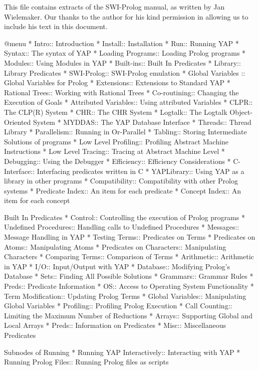 This file contains extracts of the SWI-Prolog manual, as written by Jan
Wielemaker. Our thanks to the author for his kind permission in allowing
us to include his text in this document.

@menu
* Intro:: Introduction
* Install:: Installation
* Run:: Running YAP
* Syntax:: The syntax of YAP
* Loading Programs:: Loading Prolog programs
* Modules:: Using Modules in YAP
* Built-ins:: Built In Predicates
* Library:: Library Predicates
* SWI-Prolog:: SWI-Prolog emulation
* Global Variables ::  Global Variables for Prolog
* Extensions:: Extensions to Standard YAP
* Rational Trees:: Working with Rational Trees
* Co-routining:: Changing the Execution of Goals
* Attributed Variables:: Using attributed Variables
* CLPR:: The CLP(R) System
* CHR:: The CHR System
* Logtalk:: The Logtalk Object-Oriented System
* MYDDAS:: The YAP Database Interface
* Threads:: Thread Library
* Parallelism:: Running in Or-Parallel
* Tabling:: Storing Intermediate Solutions of programs 
* Low Level Profiling:: Profiling Abstract Machine Instructions
* Low Level Tracing:: Tracing at Abstract Machine Level
* Debugging:: Using the Debugger
* Efficiency:: Efficiency Considerations
* C-Interface:: Interfacing predicates written in C
* YAPLibrary:: Using YAP as a library in other programs
* Compatibility:: Compatibility with other Prolog systems
* Predicate Index:: An item for each predicate
* Concept Index:: An item for each concept

Built In Predicates
* Control:: Controlling the execution of Prolog programs
* Undefined Procedures:: Handling calls to Undefined Procedures
* Messages:: Message Handling in YAP
* Testing Terms:: Predicates on Terms
* Predicates on Atoms:: Manipulating Atoms
* Predicates on Characters:: Manipulating Characters
* Comparing Terms:: Comparison of Terms
* Arithmetic:: Arithmetic in YAP
* I/O:: Input/Output with YAP
* Database:: Modifying Prolog's Database
* Sets:: Finding All Possible Solutions
* Grammars:: Grammar Rules
* Preds:: Predicate Information
* OS:: Access to Operating System Functionality
* Term Modification:: Updating Prolog Terms
* Global Variables:: Manipulating Global Variables
* Profiling:: Profiling Prolog Execution
* Call Counting:: Limiting the Maximum Number of Reductions
* Arrays:: Supporting Global and Local Arrays
* Preds:: Information on Predicates
* Misc:: Miscellaneous Predicates


Subnodes of Running
* Running YAP Interactively:: Interacting with YAP
* Running Prolog Files:: Running Prolog files as scripts

